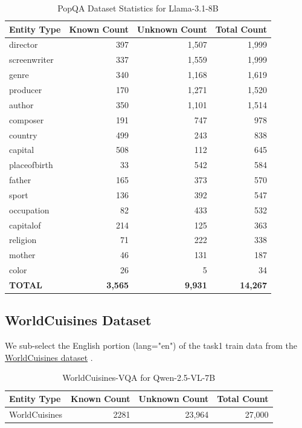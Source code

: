 \documentclass{article} %
\begin{document}
\begin{table}[htbp]
\centering
\caption{PopQA Dataset Statistics for Llama-3.1-8B}
\label{tab:popqa_stats}
\begin{tabular}{lrrr}
\toprule
\textbf{Entity Type} & \textbf{Known Count} & \textbf{Unknown Count} & \textbf{Total Count} \\
\midrule
director & 397 & 1,507 & 1,999 \\
screenwriter & 337 & 1,559 & 1,999 \\
genre & 340 & 1,168 & 1,619 \\
producer & 170 & 1,271 & 1,520 \\
author & 350 & 1,101 & 1,514 \\
composer & 191 & 747 & 978 \\
country & 499 & 243 & 838 \\
capital & 508 & 112 & 645 \\
placeofbirth & 33 & 542 & 584 \\
father & 165 & 373 & 570 \\
sport & 136 & 392 & 547 \\
occupation & 82 & 433 & 532 \\
capitalof & 214 & 125 & 363 \\
religion & 71 & 222 & 338 \\
mother & 46 & 131 & 187 \\
color & 26 & 5 & 34 \\
\midrule
\textbf{TOTAL} & \textbf{3,565} & \textbf{9,931} & \textbf{14,267} \\
\bottomrule
\end{tabular}
\end{table}



\subsection{WorldCuisines Dataset}
\label{app:WorldCuisines_dataset}

We sub-select the English portion (lang="en") of the task1 train data from the \href{https://huggingface.co/datasets/worldcuisines/vqa}{WorldCuisines dataset}  \citep{winata2024worldcuisines}.

\begin{table}[htbp]
\centering
\caption{WorldCuisines-VQA for Qwen-2.5-VL-7B}
\label{tab:cuisine_stats}
\begin{tabular}{lrrr}
\toprule
\textbf{Entity Type} & \textbf{Known Count} & \textbf{Unknown Count} & \textbf{Total Count} \\
\midrule
WorldCuisines & 2281 & 23,964 & 27,000 \\
\bottomrule
\end{tabular}
\end{table}
\end{document}
